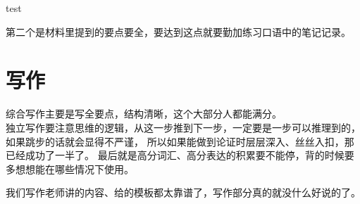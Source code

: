 \documentclass[blue,pad,cn]{elegantnote}
\begin{document}
test

\begin{note}

    第二个是材料里提到的要点要全，要达到这点就要勤加练习口语中的笔记记录。

\end{note}


\section{写作}
综合写作主要是写全要点，结构清晰，这个大部分人都能满分。\\[5cm]
独立写作要注意思维的逻辑，从这一步推到下一步，一定要是一步可以推理到的，如果跳步的话就会显得不严谨，
所以如果能做到论证时层层深入、丝丝入扣，那已经成功了一半了。
最后就是高分词汇、高分表达的积累要不能停，背的时候要多想想能在哪些情况下使用。

\begin{lemma}
    我们写作老师讲的内容、给的模板都太靠谱了，写作部分真的就没什么好说的了。
\end{lemma}
\end{document}
